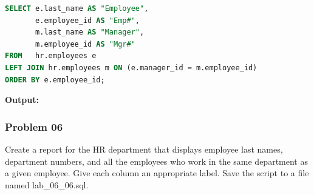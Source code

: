 \begin{frame}



\begin{lstlisting}[language=SQL]
SELECT e.last_name AS "Employee",
       e.employee_id AS "Emp#",
       m.last_name AS "Manager",
       m.employee_id AS "Mgr#"
FROM   hr.employees e
LEFT JOIN hr.employees m ON (e.manager_id = m.employee_id)
ORDER BY e.employee_id;
\end{lstlisting}
\textbf{Output: }
\end{frame}


\newpage
\subsubsection*{Problem 06}
Create a report for the HR department that displays employee last names, department numbers, and all the employees who work in the same department as a given employee. Give each column an appropriate label. Save the script to a file named lab\_06\_06.sql.

